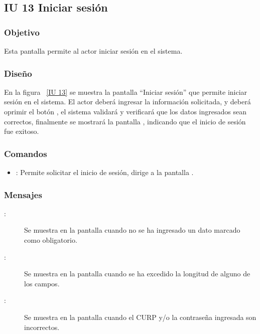 \subsection{IU 13 Iniciar sesión}

\subsubsection{Objetivo}
	
	Esta pantalla permite al actor iniciar sesión en el sistema.

\subsubsection{Diseño}

    En la figura ~\ref{IU 13} se muestra la pantalla ``Iniciar sesión'' que permite iniciar sesión en el sistema. El actor deberá ingresar la información solicitada, y deberá oprimir el botón , el sistema validará y verificará que los datos ingresados sean correctos, finalmente se mostrará la pantalla , indicando que el inicio de sesión fue exitoso.


   

\subsubsection{Comandos}
\begin{itemize}
	\item {}: Permite solicitar el inicio de sesión, dirige a la pantalla .
\end{itemize}

\subsubsection{Mensajes}

	
\begin{description}
	\item[:] Se muestra en la pantalla  cuando no se ha ingresado un dato marcado como obligatorio.
	\item[:] Se muestra en la pantalla  cuando se ha excedido la longitud de alguno de los campos.
	\item[:] Se muestra en la pantalla  cuando el CURP y/o la contraseña ingresada son incorrectos.
\end{description}
